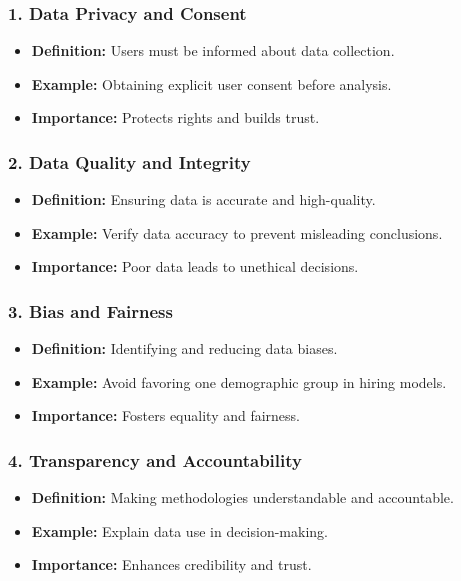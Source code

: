 \documentclass[aspectratio=169]{beamer}
\begin{document}
\begin{frame}[fragile]
    \frametitle{1. Data Privacy and Consent}
    \begin{itemize}
        \item \textbf{Definition:} Users must be informed about data collection.
        \item \textbf{Example:} Obtaining explicit user consent before analysis.
        \item \textbf{Importance:} Protects rights and builds trust.
    \end{itemize}
\end{frame}

\begin{frame}[fragile]
    \frametitle{2. Data Quality and Integrity}
    \begin{itemize}
        \item \textbf{Definition:} Ensuring data is accurate and high-quality.
        \item \textbf{Example:} Verify data accuracy to prevent misleading conclusions.
        \item \textbf{Importance:} Poor data leads to unethical decisions.
    \end{itemize}
\end{frame}

\begin{frame}[fragile]
    \frametitle{3. Bias and Fairness}
    \begin{itemize}
        \item \textbf{Definition:} Identifying and reducing data biases.
        \item \textbf{Example:} Avoid favoring one demographic group in hiring models.
        \item \textbf{Importance:} Fosters equality and fairness.
    \end{itemize}
\end{frame}

\begin{frame}[fragile]
    \frametitle{4. Transparency and Accountability}
    \begin{itemize}
        \item \textbf{Definition:} Making methodologies understandable and accountable.
        \item \textbf{Example:} Explain data use in decision-making.
        \item \textbf{Importance:} Enhances credibility and trust.
    \end{itemize}
\end{frame}
\end{document}

